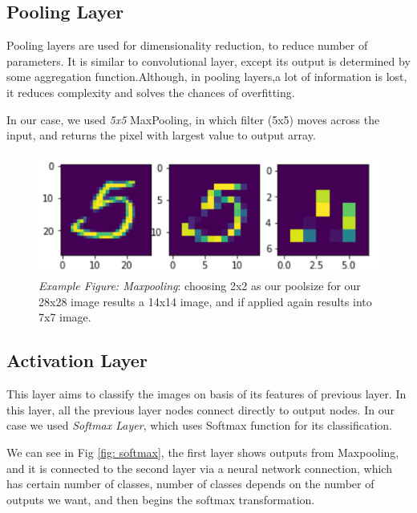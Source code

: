 \documentclass[conference]{IEEEtran}
\begin{document}
\subsection{Pooling Layer}
Pooling layers are used for dimensionality reduction, to reduce number of parameters. It is similar to convolutional layer, except its output is determined by some aggregation function.Although, in pooling layers,a lot of information is lost, it reduces complexity and solves the chances of overfitting.

In our case, we used \emph{5x5} MaxPooling, in which filter (5x5) moves across the input, and returns the pixel with largest value to output array.




\begin{figure}[h]
  \centering
  \includegraphics[scale=0.4]{images/maxpool.png}
  \caption{\emph{Example Figure: Maxpooling}: choosing 2x2 as our poolsize for our 28x28 image results a 14x14 image, and if applied again results into 7x7 image.}
  \label{fig: maxpool}
\end{figure}

\subsection{Activation Layer}

This layer aims to classify the images on basis of its features of previous layer. In this layer, all the previous layer nodes connect directly to output nodes. In our case we used \emph{Softmax Layer}\cite{CNN_Keras_VZ_SM_2019}, which uses Softmax function for its classification.

We can see in Fig \ref{fig: softmax}, the first layer shows outputs from Maxpooling, and it is connected to the second layer via a neural network connection, which has certain number of classes, number of classes depends on the number of outputs we want, and then begins the softmax transformation.
\end{document}

